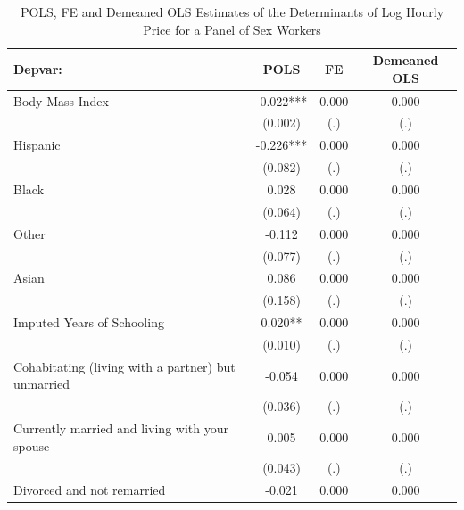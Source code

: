 \documentclass[notes=show]{beamer}
\begin{document}
\begin{frame}[plain]
\begin{table}[htbp]\centering
\tiny
\caption{POLS, FE and Demeaned OLS Estimates of the Determinants of Log Hourly Price for a Panel of Sex Workers}
\label{sasp}
\begin{center}
\begin{threeparttable}
\begin{tabular}{l*{3}{c}}
\toprule
\multicolumn{1}{l}{\textbf{Depvar:}}&
\multicolumn{1}{c}{\textbf{POLS}}&
\multicolumn{1}{c}{\textbf{FE}}&
\multicolumn{1}{c}{\textbf{Demeaned OLS}}\\
\midrule
Body Mass Index     									&      -0.022***&       0.000   &       0.000 \\
                    									&     (0.002)   &         (.)   &         (.) \\
Hispanic   									&      -0.226***&       0.000   &       0.000 \\
                    									&     (0.082)   &         (.)   &         (.) \\
Black      									&       0.028   &       0.000   &       0.000 \\
                    									&     (0.064)   &         (.)   &         (.) \\
 Other      									&      -0.112   &       0.000   &       0.000 \\
                    									&     (0.077)   &         (.)   &         (.) \\
 Asian      									&       0.086   &       0.000   &       0.000 \\
                    									&     (0.158)   &         (.)   &         (.) \\
Imputed Years of Schooling								&       0.020** &       0.000   &       0.000 \\
                   	 									&     (0.010)   &         (.)   &         (.) \\
Cohabitating (living with a partner) but unmarried	&      -0.054   &       0.000   &       0.000 \\
                    									&     (0.036)   &         (.)   &         (.) \\
Currently married and living with your spouse		&       0.005   &       0.000   &       0.000 \\
                    									&     (0.043)   &         (.)   &         (.) \\
Divorced and not remarried							&      -0.021   &       0.000   &       0.000 \\

\end{tabular}
\end{threeparttable}
\end{center}
\end{table}
\end{frame}
\end{document}
